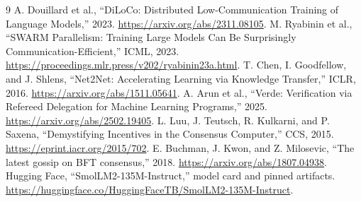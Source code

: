 \documentclass[11pt]{article}
\begin{document}
\begin{thebibliography}{9}
 A. Douillard et al., ``DiLoCo: Distributed Low-Communication Training of Language Models,'' 2023. \url{https://arxiv.org/abs/2311.08105}.
 M. Ryabinin et al., ``SWARM Parallelism: Training Large Models Can Be Surprisingly Communication-Efficient,'' ICML, 2023. \url{https://proceedings.mlr.press/v202/ryabinin23a.html}.
 T. Chen, I. Goodfellow, and J. Shlens, ``Net2Net: Accelerating Learning via Knowledge Transfer,'' ICLR, 2016. \url{https://arxiv.org/abs/1511.05641}.
 A. Arun et al., ``Verde: Verification via Refereed Delegation for Machine Learning Programs,'' 2025. \url{https://arxiv.org/abs/2502.19405}.
 L. Luu, J. Teutsch, R. Kulkarni, and P. Saxena, ``Demystifying Incentives in the Consensus Computer,'' CCS, 2015. \url{https://eprint.iacr.org/2015/702}.
 E. Buchman, J. Kwon, and Z. Milosevic, ``The latest gossip on BFT consensus,'' 2018. \url{https://arxiv.org/abs/1807.04938}.
 Hugging Face, ``SmolLM2-135M-Instruct,'' model card and pinned artifacts. \url{https://huggingface.co/HuggingFaceTB/SmolLM2-135M-Instruct}.
\end{thebibliography}
\end{document}
